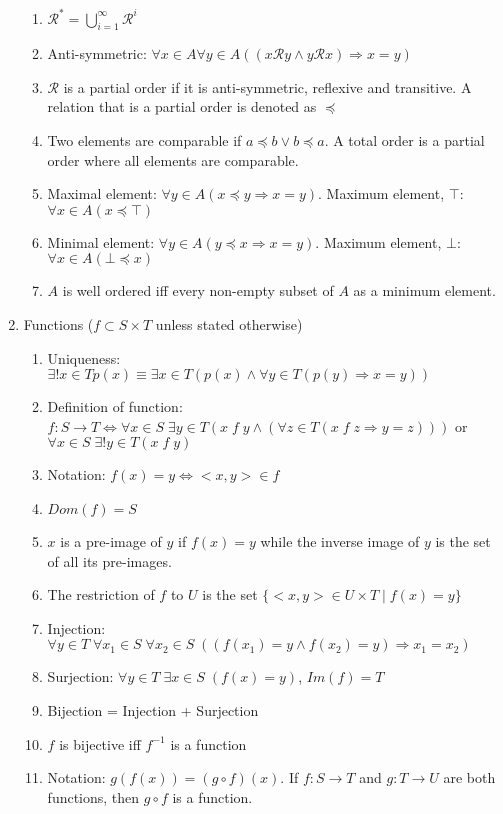 \documentclass[11pt, twocolumn]{article}
\theoremstyle{definition} \newtheorem*{solution}{Solution}
\begin{document}
\begin{enumerate}
\begin{enumerate}
\item $\mathcal{R}^* = \bigcup^{\infty}_{i=1} \mathcal{R}^i$
\item Anti-symmetric: $\forall x \in A \forall y \in A (( x\mathcal{R} y \wedge y\mathcal{R} x)\Rightarrow x=y)$
\item $\mathcal{R}$ is a partial order if it is anti-symmetric, reflexive and transitive. A relation that is a partial order is denoted as $\preceq$
\item Two elements are comparable if $a \preceq b \vee b\preceq a$. A total order is a partial order where all elements are comparable.
\item Maximal element: $\forall y \in A (x\preceq y \Rightarrow x=y)$. Maximum element, $\top$: $\forall x \in A (x\preceq \top)$
\item Minimal element: $\forall y \in A (y\preceq x \Rightarrow x=y)$. Maximum element, $\bot$: $\forall x \in A (\bot\preceq x)$
\item $A$ is well ordered iff every non-empty subset of $A$ as a minimum element.
\end{enumerate}
\item Functions ($f\subset S\times T$ unless stated otherwise)
\begin{enumerate}
\item Uniqueness: $\exists!x\in T p(x) \equiv \exists x \in T (p(x) \wedge \forall y \in T (p(y) \Rightarrow x=y))$ 
\item Definition of function: $f: S \rightarrow T \Leftrightarrow \forall x \in S \;\exists y \in T (x\;f\;y \wedge (\forall z \in T (x\;f\;z \Rightarrow y=z)))$ or $\forall x\in S \;\exists!y \in T (x\;f\;y)$
\item Notation: $f(x)=y \Leftrightarrow <x,y>\in f$
\item $Dom(f) = S$
\item $x$ is a pre-image of $y$ if $f(x)=y$ while the inverse image of $y$ is the set of all its pre-images.
\item The restriction of $f$ to $U$ is the set $\{<x,y>\in U\times T\;|\;f(x)=y\}$
\item Injection: $\forall y \in T \;\forall x_1 \in S \;\forall x_2 \in S \;((f(x_1)=y\wedge f(x_2)=y)\Rightarrow x_1=x_2)$ 
\item Surjection: $\forall y \in T \; \exists x \in S \; (f(x)=y)$, $Im(f)=T$
\item Bijection = Injection + Surjection
\item $f$ is bijective iff $f^{-1}$ is a function
\item Notation: $g(f(x)) = (g\circ f)(x)$. If $f: S \rightarrow T$ and $g: T \rightarrow U$ are both functions, then $g\circ f$ is a function.

\end{enumerate}
\end{enumerate}
\end{document}
